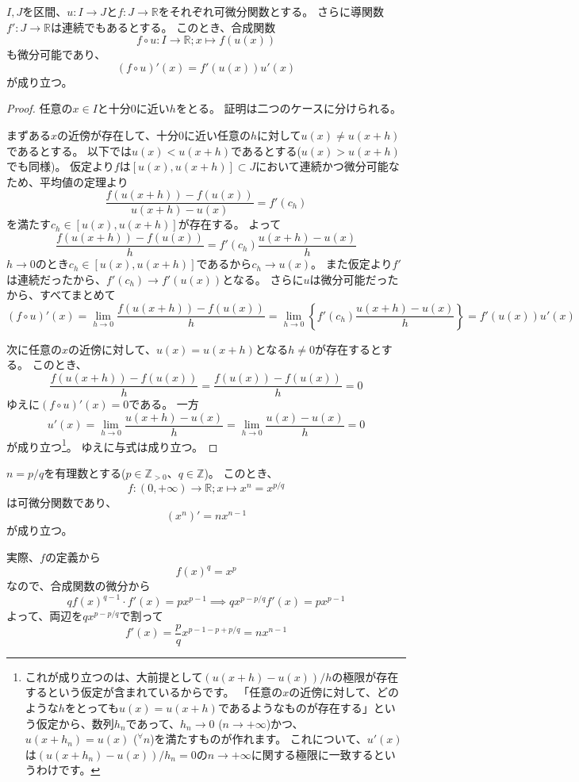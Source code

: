 \begin{corollary}[合成関数の微分]
  $I,J$を区間、$u:I\to J$と$f:J\to\mathbb{R}$をそれぞれ可微分関数とする。
  さらに導関数$f':J\to\mathbb{R}$は連続でもあるとする。
  このとき、合成関数
  \[
    f\circ u:I\to\mathbb{R};x\mapsto f(u(x))
  \]
  も微分可能であり、
  \[
    (f\circ u)'(x)=f'(u(x))u'(x)
  \]
  が成り立つ。
\end{corollary}
\begin{proof}
  任意の$x\in I$と十分0に近い$h$をとる。
  証明は二つのケースに分けられる。

  まずある$x$の近傍が存在して、十分0に近い任意の$h$に対して$u(x)\neq u(x+h)$であるとする。
  以下では$u(x)<u(x+h)$であるとする($u(x)>u(x+h)$でも同様)。
  仮定より$f$は$[u(x),u(x+h)]\subset J$において連続かつ微分可能なため、平均値の定理より
  \[
    \frac{f(u(x+h))-f(u(x))}{u(x+h)-u(x)}=f'(c_h)
  \]
  を満たす$c_h\in[u(x),u(x+h)]$が存在する。
  よって
  \[
    \frac{f(u(x+h))-f(u(x))}{h}=f'(c_h)\frac{u(x+h)-u(x)}{h}
  \]
  $h\to0$のとき$c_h\in[u(x),u(x+h)]$であるから$c_h\to u(x)$。
  また仮定より$f'$は連続だったから、$f'(c_h)\to f'(u(x))$となる。
  さらに$u$は微分可能だったから、すべてまとめて
  \[
    (f\circ u)'(x)=\lim_{h\to0}\frac{f(u(x+h))-f(u(x))}{h}=\lim_{h\to0}\left\{f'(c_h)\frac{u(x+h)-u(x)}{h}\right\}=f'(u(x))u'(x)
  \]

  次に任意の$x$の近傍に対して、$u(x)=u(x+h)$となる$h\neq0$が存在するとする。
  このとき、
  \[
    \frac{f(u(x+h))-f(u(x))}{h}=\frac{f(u(x))-f(u(x))}{h}=0
  \]
  ゆえに$(f\circ u)'(x)=0$である。
  一方
  \[
    u'(x)=\lim_{h\to0}\frac{u(x+h)-u(x)}{h}=\lim_{h\to0}\frac{u(x)-u(x)}{h}=0
  \]
  が成り立つ\footnote{
    これが成り立つのは、大前提として$(u(x+h)-u(x))/h$の極限が存在するという仮定が含まれているからです。
    「任意の$x$の近傍に対して、どのような$h$をとっても$u(x)=u(x+h)$であるようなものが存在する」という仮定から、数列$h_n$であって、$h_n\to0$ ($n\to+\infty$)かつ、$u(x+h_n)=u(x)$ (${}^\forall n$)を満たすものが作れます。
    これについて、$u'(x)$は$(u(x+h_n)-u(x))/h_n=0$の$n\to+\infty$に関する極限に一致するというわけです。
  }。
  ゆえに与式は成り立つ。
\end{proof}

\begin{example}
  $n=p/q$を有理数とする($p\in\mathbb{Z}_{>0}$、$q\in\mathbb{Z}$)。
  このとき、
  \[
    f:(0,+\infty)\to\mathbb{R};x\mapsto x^n=x^{p/q}
  \]
  は可微分関数であり、
  \[
    (x^n)'=nx^{n-1}
  \]
  が成り立つ。
\end{example}
実際、$f$の定義から
\[
  f(x)^q=x^p
\]
なので、合成関数の微分から
\[
  qf(x)^{q-1}\cdot f'(x)=px^{p-1}\implies qx^{p-p/q}f'(x)=px^{p-1}
\]
よって、両辺を$qx^{p-p/q}$で割って
\[
  f'(x)=\frac{p}{q}x^{p-1-p+p/q}=nx^{n-1}
\]
